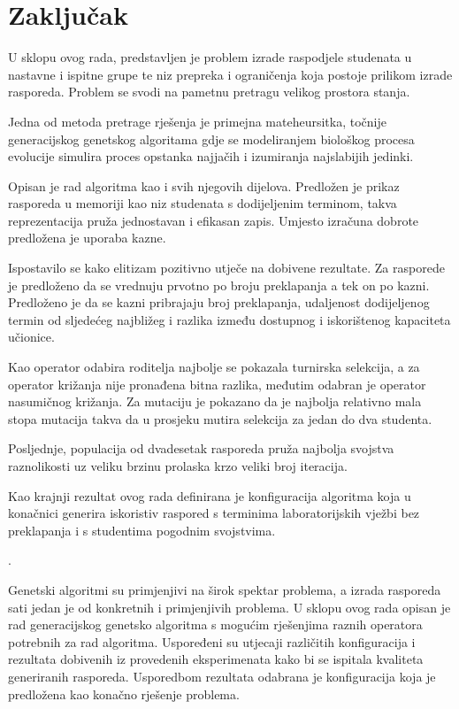 \documentclass[times, utf8, zavrsni]{fer}
\begin{document}
\chapter{Zaključak}

U sklopu ovog rada, predstavljen je problem izrade raspodjele studenata u nastavne i ispitne grupe te niz prepreka i ograničenja koja postoje prilikom izrade rasporeda. Problem se svodi na pametnu pretragu velikog prostora stanja.

Jedna od metoda pretrage rješenja je primejna mateheursitka, točnije generacijskog genetskog algoritama gdje se modeliranjem biološkog procesa evolucije simulira proces opstanka najjačih i izumiranja najslabijih jedinki.

Opisan je rad algoritma kao i svih njegovih dijelova. Predložen je prikaz rasporeda u memoriji kao niz studenata s dodijeljenim terminom, takva reprezentacija pruža jednostavan i efikasan zapis. Umjesto izračuna dobrote predložena je uporaba kazne.

Ispostavilo se kako elitizam pozitivno utječe na dobivene rezultate. Za rasporede je predloženo da se vrednuju prvotno po broju preklapanja a tek on po kazni. Predloženo je da se kazni pribrajaju broj preklapanja, udaljenost dodijeljenog termin od sljedećeg najbližeg i razlika između dostupnog i iskorištenog kapaciteta učionice.

Kao operator odabira roditelja najbolje se pokazala turnirska selekcija, a za operator križanja nije pronađena bitna razlika, međutim odabran je operator nasumičnog križanja. Za mutaciju je pokazano da je najbolja relativno mala stopa mutacija takva da u prosjeku mutira selekcija za jedan do dva studenta.

Posljednje, populacija od dvadesetak rasporeda pruža najbolja svojstva raznolikosti uz veliku brzinu prolaska krzo veliki broj iteracija.

Kao krajnji rezultat ovog rada definirana je konfiguracija algoritma koja u konačnici generira iskoristiv raspored s terminima laboratorijskih vježbi bez preklapanja i s studentima pogodnim svojstvima.

.


\begin{sazetak}
Genetski algoritmi su primjenjivi na širok spektar problema, a izrada rasporeda sati jedan je od konkretnih i primjenjivih problema. U sklopu ovog rada opisan je rad generacijskog genetsko algoritma s mogućim rješenjima raznih operatora potrebnih za rad algoritma. Uspoređeni su utjecaji različitih konfiguracija i rezultata dobivenih iz provedenih eksperimenata kako bi se ispitala kvaliteta generiranih rasporeda. Usporedbom rezultata odabrana je konfiguracija koja je predložena kao konačno rješenje problema.

\end{sazetak}
\end{document}
